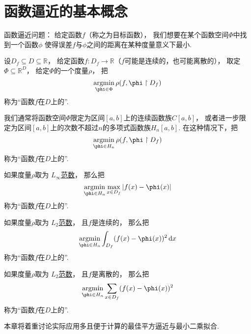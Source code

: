 \section{函数逼近的基本概念}
函数逼近问题：
给定函数\(f\)（称之为目标函数），
我们想要在某个函数空间\(\Phi\)中找到一个函数\(\phi\)
使得误差\(f\)与\(\phi\)之间的距离在某种度量意义下最小.
\begin{definition}
设\(D_f \subseteq D \subseteq \mathbb{R}\)，
给定函数\(f\colon D_f \to \mathbb{R}\)（\(f\)可能是连续的，也可能离散的），
取定\(\Phi \subseteq \mathbb{R}^D\)，
给定\(\Phi\)的一个度量\(\rho\)，
把\begin{equation*}
	\argmin_{\phi \in \Phi} \rho(f,\phi \SetRestrict D_f)
\end{equation*}
称为“函数\(f\)在\(D\)上的”.
\end{definition}

我们通常将函数空间\(\Phi\)限定为区间\([a,b]\)上的连续函数族\(C[a,b]\)，
或者进一步限定为区间\([a,b]\)上的次数不超过\(n\)的多项式函数族\(H_n[a,b]\).
在这种情况下，把\begin{equation*}
	\argmin_{\phi \in H_n} \rho(f,\phi \SetRestrict D_f)
\end{equation*}
称为“函数\(f\)在\(D\)上的”.

如果度量\(\rho\)取为 \hyperref[equation:范数.连续函数的无穷范数]{\(L_\infty\)范数}，
那么把\begin{equation*}
	\argmin_{\phi \in H_n} \max_{x \in D_f} \abs{f(x) - \phi(x)}
\end{equation*}
称为“函数\(f\)在\(D\)上的”.

如果度量\(\rho\)取为 \hyperref[equation:范数.连续函数的L2范数]{\(L_2\)范数}，
且\(f\)是连续的，
那么把\begin{equation*}
	\argmin_{\phi \in H_n} \int_{D_f} (f(x) - \phi(x))^2 \dd{x}
\end{equation*}
称为“函数\(f\)在\(D\)上的”.

如果度量\(\rho\)取为 \hyperref[equation:范数.连续函数的L2范数]{\(L_2\)范数}，
且\(f\)是离散的，
那么把\begin{equation*}
	\argmin_{\phi \in H_n} \sum_{x \in D_f} (f(x) - \phi(x))^2
\end{equation*}
称为“函数\(f\)在\(D\)上的”.

本章将着重讨论实际应用多且便于计算的最佳平方逼近与最小二乘拟合.
